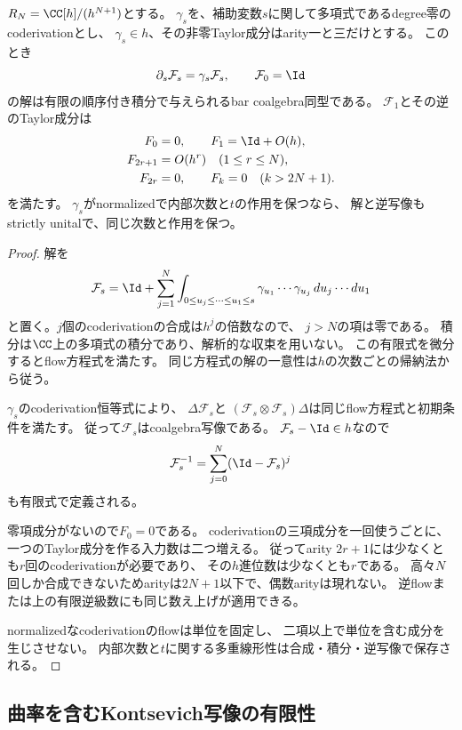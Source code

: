 \begin{lemma}[任意の有限Artin次数でのflowのarity]
\label{cg:lem:artin-flow}
$R_N=\CC[h]/(h^{N+1})$とする。
$\gamma_s$を、補助変数$s$に関して多項式であるdegree零のcoderivationとし、
$\gamma_s\in h$、その非零Taylor成分はarity一と三だけとする。
このとき
\[
 \partial_s\mathcal F_s=\gamma_s\mathcal F_s,\qquad
 \mathcal F_0=\Id
\]
の解は有限の順序付き積分で与えられるbar coalgebra同型である。
$\mathcal F_1$とその逆のTaylor成分は
\begin{equation}\label{cg:eq:general-arity}
 \begin{aligned}
 F_0&=0,\qquad F_1=\Id+O(h),\\
 F_{2r+1}&=O(h^r)\quad(1\le r\le N),\\
 F_{2r}&=0,\qquad F_k=0\quad(k>2N+1).
 \end{aligned}
\end{equation}
を満たす。
$\gamma_s$がnormalizedで内部次数と$t$の作用を保つなら、
解と逆写像もstrictly unitalで、同じ次数と作用を保つ。
\end{lemma}
\begin{proof}
解を
\[
 \mathcal F_s=\Id+
 \sum_{j=1}^{N}
 \int_{0\le u_j\le\cdots\le u_1\le s}
 \gamma_{u_1}\cdots\gamma_{u_j}\,
 du_j\cdots du_1
\]
と置く。$j$個のcoderivationの合成は$h^j$の倍数なので、
$j>N$の項は零である。
積分は$\CC$上の多項式の積分であり、解析的な収束を用いない。
この有限式を微分するとflow方程式を満たす。
同じ方程式の解の一意性は$h$の次数ごとの帰納法から従う。

$\gamma_s$のcoderivation恒等式により、
$\Delta\mathcal F_s$と
$(\mathcal F_s\otimes\mathcal F_s)\Delta$は同じflow方程式と初期条件を満たす。
従って$\mathcal F_s$はcoalgebra写像である。
$\mathcal F_s-\Id\in h$なので
\[
 \mathcal F_s^{-1}
 =\sum_{j=0}^{N}(\Id-\mathcal F_s)^j
\]
も有限式で定義される。

零項成分がないので$F_0=0$である。
coderivationの三項成分を一回使うごとに、
一つのTaylor成分を作る入力数は二つ増える。
従ってarity $2r+1$には少なくとも$r$回のcoderivationが必要であり、
その$h$進位数は少なくとも$r$である。
高々$N$回しか合成できないためarityは$2N+1$以下で、偶数arityは現れない。
逆flowまたは上の有限逆級数にも同じ数え上げが適用できる。

normalizedなcoderivationのflowは単位を固定し、
二項以上で単位を含む成分を生じさせない。
内部次数と$t$に関する多重線形性は合成・積分・逆写像で保存される。
\end{proof}

\subsection{曲率を含むKontsevich写像の有限性}

